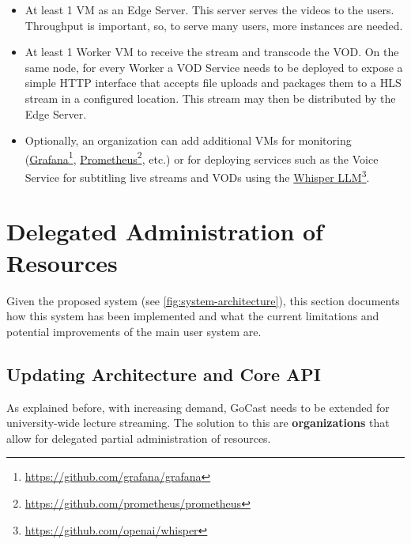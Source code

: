 \begin{itemize}
    \item At least 1 \ac{VM} as an Edge Server. This server serves the videos to the users. Throughput is important, so, to serve many users, more instances are needed.
    \item At least 1 Worker \ac{VM} to receive the stream and transcode the \ac{VOD}. On the same node, for every Worker a VOD Service needs to be deployed to expose a simple HTTP interface that accepts file uploads and packages them to a \ac{HLS} stream in a configured location. This stream may then be distributed by the Edge Server.
    \item Optionally, an organization can add additional \ac{VM}s for monitoring (\href{https://github.com/grafana/grafana}{Grafana}\footnote{\url{https://github.com/grafana/grafana}}, \href{https://github.com/prometheus/prometheus}{Prometheus}\footnote{\url{https://github.com/prometheus/prometheus}}, etc.) or for deploying services such as the Voice Service for subtitling live streams and \ac{VOD}s using the \href{https://github.com/openai/whisper}{Whisper LLM}\footnote{\url{https://github.com/openai/whisper}}.
\end{itemize}


\section{Delegated Administration of Resources}\label{section:rbac}

Given the proposed system (see \autoref{fig:system-architecture}), this section documents how this system has been implemented and what the current limitations and potential improvements of the main user system are. 

\subsection{Updating Architecture and Core API}

As explained before, with increasing demand, GoCast needs to be extended for university-wide lecture streaming. The solution to this are \textbf{organizations} that allow for delegated partial administration of resources.

